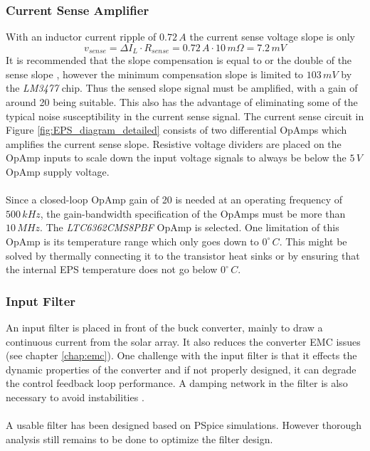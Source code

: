 \subsubsection*{Current Sense Amplifier}
With an inductor current ripple of $0.72\,A$ the current sense voltage slope is only 
%
\begin{equation}
v_{sense}=\Delta I_L\cdot R_{sense}=0.72\,A\cdot 10\,m\Omega = 7.2\,mV
\end{equation}
%
It is recommended that the slope compensation is equal to or the double of the sense slope \cite[sec. 12-1]{Fundamentals}, however the minimum compensation slope is limited to $103\,mV$ by the \textit{LM3477} chip. Thus the sensed slope signal must be amplified, with a gain of around 20 being suitable. This also has the advantage of eliminating some of the typical noise susceptibility in the current sense signal. The current sense circuit in Figure \ref{fig:EPS_diagram_detailed} consists of two differential OpAmps which amplifies the current sense slope. Resistive voltage dividers are placed on the OpAmp inputs to scale down the input voltage signals to always be below the $5\,V$ OpAmp supply voltage.
\\
\\
Since a closed-loop OpAmp gain of 20 is needed at an operating frequency of $500\,kHz$, the gain-bandwidth specification of the OpAmps must be more than $10\,MHz$. The \textit{LTC6362CMS8PBF} OpAmp is selected. One limitation of this OpAmp is its temperature range which only goes down to $0^{\circ}\,C$. This might be solved by thermally connecting it to the transistor heat sinks or by ensuring that the internal \ac{EPS} temperature does not go below $0^{\circ}\,C$.
%
\subsubsection*{Input Filter}
An input filter is placed in front of the buck converter, mainly to draw a continuous current from the solar array. It also reduces the converter \ac{EMC} issues (see chapter \ref{chap:emc}). One challenge with the input filter is that it effects the dynamic properties of the converter and if not properly designed, it can degrade the control feedback loop performance. A damping network in the filter is also necessary to avoid instabilities \cite[sec. 10-3]{Fundamentals}.
\\
\\
A usable filter has been designed based on PSpice simulations. However thorough analysis still remains to be done to optimize the filter design.
%
%
